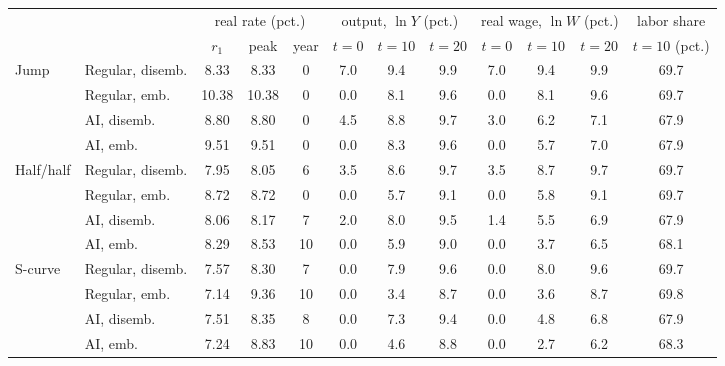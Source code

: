 \begin{tabular}{llcccccccccc}\toprule
 & & \multicolumn{3}{c}{real rate (pct.)} & \multicolumn{3}{c}{output, $\ln Y$ (pct.)} & \multicolumn{3}{c}{real wage, $\ln W$ (pct.)} & labor share\\
\cmidrule(lr){3-5}\cmidrule(lr){6-8}\cmidrule(lr){9-11}\cmidrule(lr){12-12}
 & & $r_1$ & peak & year & $t{=}0$ & $t{=}10$ & $t{=}20$ & $t{=}0$ & $t{=}10$ & $t{=}20$ & $t{=}10$ (pct.)\\\midrule
Jump & Regular, disemb. & 8.33 & 8.33 & 0 & 7.0 & 9.4 & 9.9 & 7.0 & 9.4 & 9.9 & 69.7\\
 & Regular, emb. & 10.38 & 10.38 & 0 & 0.0 & 8.1 & 9.6 & 0.0 & 8.1 & 9.6 & 69.7\\
 & AI, disemb. & 8.80 & 8.80 & 0 & 4.5 & 8.8 & 9.7 & 3.0 & 6.2 & 7.1 & 67.9\\
 & AI, emb. & 9.51 & 9.51 & 0 & 0.0 & 8.3 & 9.6 & 0.0 & 5.7 & 7.0 & 67.9\\
\midrule
Half/half & Regular, disemb. & 7.95 & 8.05 & 6 & 3.5 & 8.6 & 9.7 & 3.5 & 8.7 & 9.7 & 69.7\\
 & Regular, emb. & 8.72 & 8.72 & 0 & 0.0 & 5.7 & 9.1 & 0.0 & 5.8 & 9.1 & 69.7\\
 & AI, disemb. & 8.06 & 8.17 & 7 & 2.0 & 8.0 & 9.5 & 1.4 & 5.5 & 6.9 & 67.9\\
 & AI, emb. & 8.29 & 8.53 & 10 & 0.0 & 5.9 & 9.0 & 0.0 & 3.7 & 6.5 & 68.1\\
\midrule
S-curve & Regular, disemb. & 7.57 & 8.30 & 7 & 0.0 & 7.9 & 9.6 & 0.0 & 8.0 & 9.6 & 69.7\\
 & Regular, emb. & 7.14 & 9.36 & 10 & 0.0 & 3.4 & 8.7 & 0.0 & 3.6 & 8.7 & 69.8\\
 & AI, disemb. & 7.51 & 8.35 & 8 & 0.0 & 7.3 & 9.4 & 0.0 & 4.8 & 6.8 & 67.9\\
 & AI, emb. & 7.24 & 8.83 & 10 & 0.0 & 4.6 & 8.8 & 0.0 & 2.7 & 6.2 & 68.3\\
\bottomrule\end{tabular}

